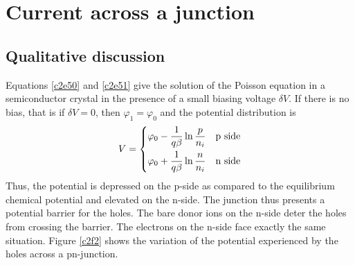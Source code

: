 \section{Current across a junction}\label{c2s4}
\subsection{Qualitative discussion}
Equations \eqref{c2e50} and \eqref{c2e51} give the solution of the Poisson 
equation in a semiconductor crystal in the presence of a small biasing voltage
$\delta V$. If there is no bias, that is if $\delta V = 0$, then $\varphi_1 =
\varphi_0$ and the potential distribution is
\begin{equation}\label{c2e78}
V = \begin{dcases} 
    \varphi_0 - \frac{1}{q\beta}\ln\frac{p}{n_i} & \text{p side} \\
    \varphi_0 + \frac{1}{q\beta}\ln\frac{n}{n_i} & \text{n side}
\end{dcases}
\end{equation}
Thus, the potential is depressed on the p-side as compared to the equilibrium 
chemical potential and elevated on the n-side. The junction thus presents a
potential barrier for the holes. The bare donor ions on the n-side deter the
holes from crossing the barrier. The electrons on the n-side face exactly the
same situation. Figure \ref{c2f2} shows the variation of the potential 
experienced by the holes across a pn-junction.
